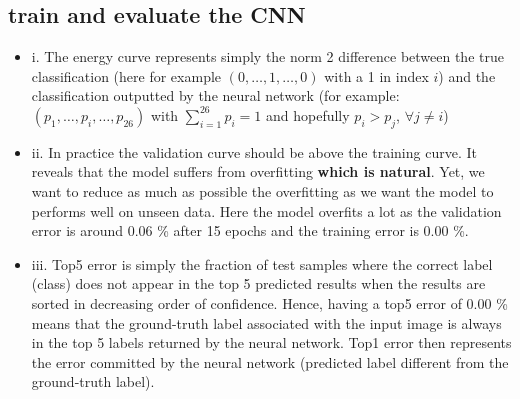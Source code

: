 \documentclass{article}
\begin{document}
\subsection{train and evaluate the CNN}


\begin{itemize}
\item i. The energy curve represents simply the norm 2 difference between the true classification (here for example $(0, \hdots, 1, \hdots, 0)$ with a 1 in index $i$) and the classification outputted by the neural network (for example: $(p_1, \hdots, p_i, \hdots, p_{26})$ with $\sum\limits_{i=1}^{26} p_{i} = 1$ and hopefully $p_{i} > p_{j}$, $\forall j \neq i$)
\item ii. In practice the validation curve should be above the training curve. It reveals that the model suffers from overfitting \textbf{which is natural}. Yet, we want to reduce as much as possible the overfitting as we want the model to performs well on unseen data. Here the model overfits a lot as the validation error is around 0.06 \% after 15 epochs and the training error is 0.00 \%.
\item iii. Top5 error is simply the fraction of test samples where the correct label (class) does not appear in the top 5 predicted results when the results are sorted in decreasing order of confidence. Hence, having a top5 error of 0.00 \% means that the ground-truth label associated with the input image is always in the top 5 labels returned by the neural network. Top1 error then represents the error committed by the neural network (predicted label different from the ground-truth label).
\end{itemize}
\end{document}

